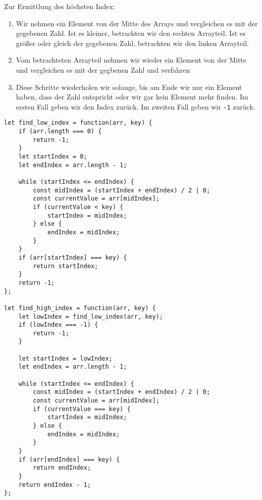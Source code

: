 \documentclass[babel]{book}
\begin{document}
Zur Ermittlung des höchsten Index:
\begin{enumerate}
	\item Wir nehmen ein Element von der Mitte des Arrays und vergleichen es mit der gegebenen Zahl. Ist es kleiner, betrachten wir den rechten Arrayteil. Ist es größer oder gleich der gegebenen Zahl, betrachten wir den linken Arrayteil.
	\item Vom betrachteten Arrayteil nehmen wir wieder ein Element von der Mitte und vergleichen es mit der gegbenen Zahl und verfahren 
	\item Diese Schritte wiederholen wir solange, bis am Ende wir nur ein Element haben, dass der Zahl entspricht oder wir gar kein Element mehr finden. Im ersten Fall geben wir den Index zurück. Im zweiten Fall geben wir \lstinline|-1| zurück.
\end{enumerate}

\begin{lstlisting}[caption=My Javascript Example]
let find_low_index = function(arr, key) {
	if (arr.length === 0) {
		return -1;
	}
	let startIndex = 0;
	let endIndex = arr.length - 1;

	while (startIndex <= endIndex) {
		const midIndex = (startIndex + endIndex) / 2 | 0;
		const currentValue = arr[midIndex];
		if (currentValue < key) {
			startIndex = midIndex;
		} else {
			endIndex = midIndex;
		}
	}
	if (arr[startIndex] === key) {
		return startIndex;
	}
	return -1;
};

let find_high_index = function(arr, key) {
	let lowIndex = find_low_index(arr, key);
	if (lowIndex === -1) {
		return -1;
	}

	let startIndex = lowIndex;
	let endIndex = arr.length - 1;
	
	while (startIndex <= endIndex) {
		const midIndex = (startIndex + endIndex) / 2 | 0;
		const currentValue = arr[midIndex];
		if (currentValue === key) {
			startIndex = midIndex;
		} else {
			endIndex = midIndex;
		}
	}
	if (arr[endIndex] === key) {
		return endIndex;
	}
	return endIndex - 1;
};
\end{lstlisting}
\end{document}
